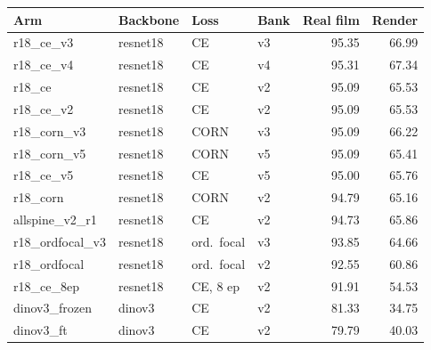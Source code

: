 \begin{tabular}{llllrr}
\toprule
Arm & Backbone & Loss & Bank & Real film & Render \\
\midrule
r18\_ce\_v3 & resnet18 & CE & v3 & 95.35 & 66.99 \\
r18\_ce\_v4 & resnet18 & CE & v4 & 95.31 & 67.34 \\
r18\_ce & resnet18 & CE & v2 & 95.09 & 65.53 \\
r18\_ce\_v2 & resnet18 & CE & v2 & 95.09 & 65.53 \\
r18\_corn\_v3 & resnet18 & CORN & v3 & 95.09 & 66.22 \\
r18\_corn\_v5 & resnet18 & CORN & v5 & 95.09 & 65.41 \\
r18\_ce\_v5 & resnet18 & CE & v5 & 95.00 & 65.76 \\
r18\_corn & resnet18 & CORN & v2 & 94.79 & 65.16 \\
allspine\_v2\_r1 & resnet18 & CE & v2 & 94.73 & 65.86 \\
r18\_ordfocal\_v3 & resnet18 & ord.\ focal & v3 & 93.85 & 64.66 \\
r18\_ordfocal & resnet18 & ord.\ focal & v2 & 92.55 & 60.86 \\
r18\_ce\_8ep & resnet18 & CE, 8 ep & v2 & 91.91 & 54.53 \\
dinov3\_frozen & dinov3 & CE & v2 & 81.33 & 34.75 \\
dinov3\_ft & dinov3 & CE & v2 & 79.79 & 40.03 \\
\bottomrule
\end{tabular}
